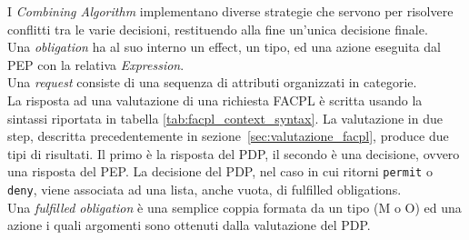 I \textit{Combining Algorithm} implementano diverse strategie che servono per risolvere conflitti tra le varie decisioni, restituendo alla fine un'unica decisione finale.\\
Una \textit{obligation} ha al suo interno un effect, un tipo, ed una azione eseguita dal PEP con la relativa \textit{Expression}.\\
Una \textit{request} consiste di una sequenza di attributi organizzati in categorie.\\
La risposta ad una valutazione di una richiesta FACPL è scritta usando la sintassi riportata in tabella \ref{tab:facpl_context_syntax}.
La valutazione in due step, descritta precedentemente in sezione~\ref{sec:valutazione_facpl}, produce due tipi di risultati. Il primo è la risposta del PDP, il secondo è una decisione, ovvero una risposta del PEP.
La decisione del PDP, nel caso in cui ritorni \texttt{permit} o \texttt{deny}, viene associata ad una lista, anche vuota, di fulfilled obligations.\\
Una \textit{fulfilled obligation} è una semplice coppia formata da un tipo (M o O) ed una azione i quali argomenti sono ottenuti dalla valutazione del PDP.

